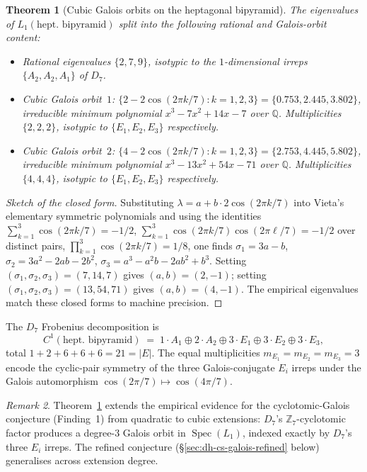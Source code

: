 \documentclass[12pt,a4paper]{article}
\newtheorem{theorem}{Theorem}[section]
\theoremstyle{definition}
\theoremstyle{remark}
\newtheorem{remark}[theorem]{Remark}
\newcommand{\bZ}{\mathbb{Z}}
\newcommand{\bQ}{\mathbb{Q}}                %
\DeclareMathOperator{\Spec}{Spec}
\begin{document}
\begin{theorem}[Cubic Galois orbits on the heptagonal bipyramid]\label{thm:hept-galois}
The eigenvalues of $L_1(\text{hept. bipyramid})$ split into the
following rational and Galois-orbit content:
\begin{itemize}\setlength{\itemsep}{1pt}
\item Rational eigenvalues $\{2, 7, 9\}$, isotypic to the
  $1$-dimensional irreps $\{A_2, A_2, A_1\}$ of $D_7$.
\item Cubic Galois orbit~$1$:
  $\{2 - 2\cos(2\pi k/7) : k = 1, 2, 3\} = \{0.753, 2.445, 3.802\}$,
  irreducible minimum polynomial $x^3 - 7x^2 + 14x - 7$ over $\bQ$.
  Multiplicities $\{2, 2, 2\}$, isotypic to $\{E_1, E_2, E_3\}$
  respectively.
\item Cubic Galois orbit~$2$:
  $\{4 - 2\cos(2\pi k/7) : k = 1, 2, 3\} = \{2.753, 4.445, 5.802\}$,
  irreducible minimum polynomial $x^3 - 13x^2 + 54x - 71$ over $\bQ$.
  Multiplicities $\{4, 4, 4\}$, isotypic to $\{E_1, E_2, E_3\}$
  respectively.
\end{itemize}
\end{theorem}

\begin{proof}[Sketch of the closed form]
Substituting $\lambda = a + b \cdot 2\cos(2\pi k/7)$ into Vieta's
elementary symmetric polynomials and using the identities
$\sum_{k=1}^3 \cos(2\pi k/7) = -1/2$,
$\sum_{k=1}^3 \cos(2\pi k/7)\cos(2\pi \ell/7) = -1/2$ over distinct
pairs, $\prod_{k=1}^3 \cos(2\pi k/7) = 1/8$, one finds
$\sigma_1 = 3a - b$, $\sigma_2 = 3a^2 - 2ab - 2b^2$,
$\sigma_3 = a^3 - a^2 b - 2 a b^2 + b^3$. Setting
$(\sigma_1, \sigma_2, \sigma_3) = (7, 14, 7)$ gives $(a, b) = (2, -1)$;
setting $(\sigma_1, \sigma_2, \sigma_3) = (13, 54, 71)$ gives
$(a, b) = (4, -1)$. The empirical eigenvalues match these closed forms
to machine precision.
\end{proof}

The $D_7$ Frobenius decomposition is
\[
  C^1(\text{hept. bipyramid}) \;=\;
  1 \cdot A_1 \oplus 2 \cdot A_2 \oplus 3 \cdot E_1
  \oplus 3 \cdot E_2 \oplus 3 \cdot E_3,
\]
total $1 + 2 + 6 + 6 + 6 = 21 = |E|$. The equal multiplicities
$m_{E_1} = m_{E_2} = m_{E_3} = 3$ encode the cyclic-pair symmetry of
the three Galois-conjugate $E_i$ irreps under the Galois automorphism
$\cos(2\pi/7) \mapsto \cos(4\pi/7)$.

\begin{remark}
Theorem~\ref{thm:hept-galois} extends the empirical evidence for the
cyclotomic-Galois conjecture (Finding~1) from quadratic to cubic
extensions: $D_7$'s $\bZ_7$-cyclotomic factor produces a degree-$3$
Galois orbit in $\Spec(L_1)$, indexed exactly by $D_7$'s three $E_i$
irreps. The refined conjecture (\S\ref{sec:dh-cs-galois-refined} below)
generalises across extension degree.
\end{remark}
\end{document}
